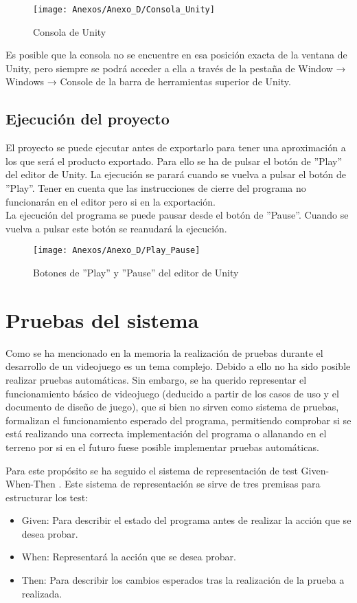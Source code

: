 \begin{figure}[h]
\centering
\texttt{[image: Anexos/Anexo\_D/Consola\_Unity]}
\caption{Consola de Unity}
\end{figure}

Es posible que la consola no se encuentre en esa posición exacta de la ventana de Unity, pero siempre se podrá acceder a ella a través de la pestaña de Window → Windows → Console de la barra de herramientas superior de Unity.

\subsection{Ejecución del proyecto}
El proyecto se puede ejecutar antes de exportarlo para tener una aproximación a los que será el producto exportado. Para ello se ha de pulsar el botón de ''Play'' del editor de Unity. La ejecución se parará cuando se vuelva a pulsar el botón de ''Play''. Tener en cuenta que las instrucciones de cierre del programa no funcionarán en el editor pero si en la exportación.\\
La ejecución del programa se puede pausar desde el botón de ''Pause''. Cuando se vuelva a pulsar este botón se reanudará la ejecución.

\begin{figure}[h]
\centering
\texttt{[image: Anexos/Anexo\_D/Play\_Pause]}
\caption{Botones de ''Play'' y ''Pause'' del editor de Unity}
\end{figure}

\section{Pruebas del sistema}
Como se ha mencionado en la memoria la realización de pruebas durante el desarrollo de un videojuego es un tema complejo. Debido a ello no ha sido posible realizar pruebas automáticas. Sin embargo, se ha querido representar el funcionamiento básico de videojuego (deducido a partir de los casos de uso y el documento de diseño de juego), que si bien no sirven como sistema de pruebas, formalizan el funcionamiento esperado del programa, permitiendo comprobar si se está realizando una correcta implementación del programa o allanando en el terreno por si en el futuro fuese posible implementar pruebas automáticas.

Para este propósito se ha seguido el sistema de representación de test Given-When-Then \cite{GWT}. Este sistema de representación se sirve de tres premisas para estructurar los test:
\begin{itemize}
\item
Given: Para describir el estado del programa antes de realizar la acción que se desea probar.
\item
When: Representará la acción que se desea probar.
\item
Then: Para describir los cambios esperados tras la realización de la prueba a realizada.
\end{itemize}

